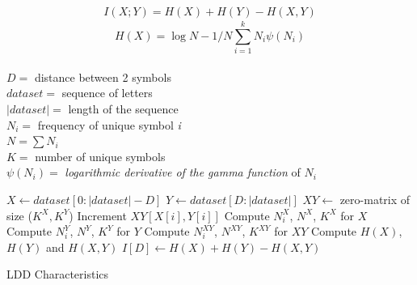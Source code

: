 \documentclass[a0,portrait]{a0poster}
\begin{document}
\begin{multicols}{2}
\begin{multicols}{2}
\begin{equation*}
\begin{aligned}
I(X;Y) = H(X) + H(Y) - H(X,Y)
\label{eq:mut-inf-h}
\end{aligned}
\end{equation*}
\begin{equation*}
H(X) = \log N - 1/N \sum_{i=1}^{k} N_i \psi(N_i)
\label{eq:entropy-adj}
\end{equation*}
\\
$D=$ distance between 2 symbols \\
$dataset=$ sequence of letters \\
$|dataset|=$ length of the sequence \\
$N_i=$ frequency of unique symbol \emph{i} \\
$N = \sum N_i$ \\
$K=$ number of unique symbols \\
$\psi(N_i)=$ \emph{logarithmic derivative of the gamma function} of $N_i$ \\

\columnbreak
\begin{algorithm}[H]
\begin{algorithmic}
  \State $X \gets dataset[0:|dataset|-D]$
  \State $Y \gets dataset[D:|dataset|]$
  \State $XY \gets$ zero-matrix of size ($K^X,K^Y$)
    \State Increment $XY[X[i],Y[i]]$
  \EndFor
  \State Compute $N_i^X$, $N^X$, $K^X$ for $X$
  \State Compute $N_i^Y$, $N^Y$, $K^Y$ for $Y$
  \State Compute $N_i^{XY}$, $N^{XY}$, $K^{XY}$ for $XY$
  \State Compute $H(X)$, $H(Y)$ and $H(X,Y)$ %
  \State $I[D]\gets H(X)+H(Y)-H(X,Y)$
 \EndFor
\caption{LDD Characteristics}\label{ldd_algo}
\end{algorithmic}
\end{algorithm}
\end{multicols}


\end{multicols}
\end{document}
